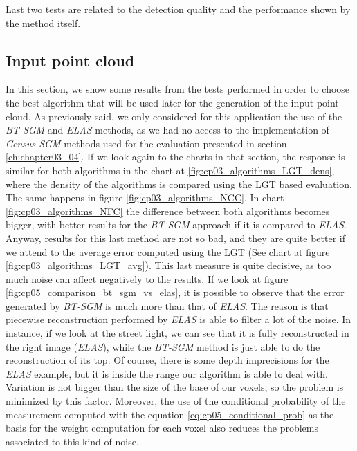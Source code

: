 Last two tests are related to the detection quality and the performance shown by the method itself.

\subsection{Input point cloud}\label{ch:chapter05_02_01}

In this section, we show some results from the tests performed in order to choose the best algorithm that will be used later for the generation of the input point cloud. As previously said, we only considered for this application the use of the \emph{BT-SGM} and \emph{ELAS} methods, as we had no access to the implementation of \emph{Census-SGM} methods used for the evaluation presented in section \ref{ch:chapter03_04}. If we look again to the charts in that section, the response is similar for both algorithms in the chart at \ref{fig:cp03_algorithms_LGT_dens}, where the density of the algorithms is compared using the \ac{LGT} based evaluation. The same happens in figure \ref{fig:cp03_algorithms_NCC}. In chart \ref{fig:cp03_algorithms_NFC} the difference between both algorithms becomes bigger, with better results for the \emph{BT-SGM} approach if it is compared to \emph{ELAS}. Anyway, results for this last method are not so bad, and they are quite better if we attend to the average error computed using the \ac{LGT} (See chart at figure \ref{fig:cp03_algorithms_LGT_avg}). This last measure is quite decisive, as too much noise can affect negatively to the results. If we look at figure \ref{fig:cp05_comparison_bt_sgm_vs_elas}, it is possible to observe that the error generated by \emph{BT-SGM} is much more than that of \emph{ELAS}. The reason is that piecewise reconstruction performed by \emph{ELAS} is able to filter a lot of the noise. In instance, if we look at the street light, we can see that it is fully reconstructed in the right image (\emph{ELAS}), while the \emph{BT-SGM} method is just able to do the reconstruction of its top. Of course, there is some depth imprecisions for the \emph{ELAS} example, but it is inside the range our algorithm is able to deal with. Variation is not bigger than the size of the base of our voxels, so the problem is minimized by this factor. Moreover, the use of the conditional probability of the measurement computed with the equation \ref{eq:cp05_conditional_prob} as the basis for the weight computation for each voxel also reduces the problems associated to this kind of noise.

